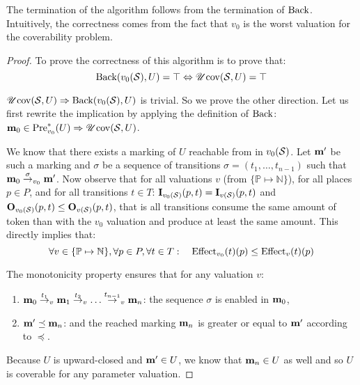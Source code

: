 The termination of the algorithm follows from the termination of $\operatorname{Back}$.
Intuitively, the correctness comes from the fact that $v_0$ is the worst valuation for the coverability problem.

\begin{proof}
  To prove the correctness of this algorithm is to prove that:
  \[
    \operatorname{Back}(v_0(\mathcal{S}), U) = \top \Leftrightarrow \operatorname{\mathscr{U}cov}(\mathcal{S}, U) = \top
  \]

$\operatorname{\mathscr{U}cov}(\mathcal{S}, U) \Rightarrow \operatorname{Back}(v_0(\mathcal{S}), U)$ is trivial. So we prove the other direction. Let us first rewrite the implication by applying the definition of $\operatorname{Back}$: $\mathbf{m}_0 \in \operatorname{Pre}_{v_0}^*(U) \Rightarrow \operatorname{\mathscr{U}cov}(\mathcal{S}, U)$.


  We know that there exists a marking of $U$ reachable from \mari in $v_0(\mathcal{S})$.
  Let $\mathbf{m'}$ be such a marking and $\sigma$ be a sequence of transitions $\sigma = (t_1, \dots, t_{n-1})$ such that $\mathbf{m}_0 \stackrel{\sigma}{\to}_{v_0} \mathbf{m'}$.
  Now observe that for all valuations $v$ (from $\{\mathbb{P} \mapsto \mathbb{N}\}$), for all places $p \in P$, and for all transitions $t \in T$: $\mathbf{I}_{v_0(\mathcal{S})}(p,t) = \mathbf{I}_{v(\mathcal{S})}(p,t)$ and $\mathbf{O}_{v_0(\mathcal{S})}(p,t) \leq \mathbf{O}_{v(\mathcal{S})}(p,t)$, that is all transitions consume the same amount of token than with the $v_0$ valuation and produce at least the same amount. This directly implies that: 
  \[
    \forall v \in \{\mathbb{P} \mapsto \mathbb{N}\}, \forall p \in P, \forall t \in T :
  \quad
  \operatorname{Effect}_{v_0}(t)(p) \leq \operatorname{Effect}_v(t)(p)
  \]

The monotonicity property ensures that for any valuation $v$:
  \begin{enumerate}
    \item $\mathbf{m}_0 \stackrel{t_1}{\to}_v \mathbf{m}_1 \stackrel{t_2}{\to}_v \dots \stackrel{t_{n-1}}{\to}_v \mathbf{m}_n$: the sequence $\sigma$ is enabled  in $\mathbf{m}_0$,
    \item $\mathbf{m'} \preceq \mathbf{m}_n$: and the reached marking $\mathbf{m}_n$ is greater or equal to $\mathbf{m'}$ according to $\preceq$.
  \end{enumerate}

  Because $U$ is upward-closed and $\mathbf{m'} \in U$, we know that $\mathbf{m}_n \in U$ as well and so $U$ is coverable for any parameter valuation.
\end{proof}

